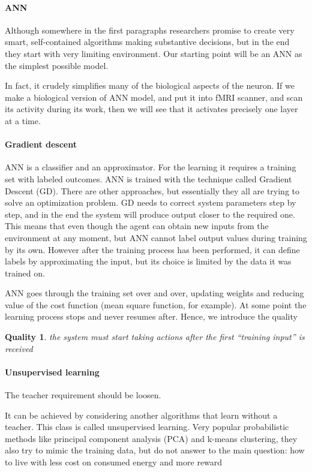 \documentclass[draft]{article}
\newtheorem{Qual}{Quality}
\begin{document}
\paragraph{ANN}
Although somewhere in the first paragraphs researchers promise to create very smart, self-contained algorithms making substantive decisions, but in the end they start with very limiting environment. Our starting point will be an ANN as the simplest possible model.

In fact, it crudely simplifies many of the biological aspects of the neuron. If we make a biological version of ANN model, and put it into fMRI scanner, and scan its activity during its work, then we will see that it activates precisely one layer at a time.

\paragraph{Gradient descent}
ANN is a classifier and an approximator. 
For the learning it requires a training set with labeled outcomes. 
ANN is trained with the technique called Gradient Descent (GD). There are other approaches, but essentially they all are trying to solve an optimization problem.
GD needs to correct system parameters step by step, and in the end the system will produce output closer to the required one.
This means that even though the agent can obtain new inputs from the environment at any moment, but ANN cannot label output values during training by its own. However after the training process has been performed, it can define labels by approximating the input, but its choice is limited by the data it was trained on.

ANN goes through the training set over and over, updating weights and reducing value of the cost function (mean square function, for example). At some point the learning process stops and never resumes after. Hence, we introduce the quality 

\begin{Qual}\label{q1}
the system must start taking actions after the first “training input” is received
\end{Qual}

\paragraph{Unsupervised learning}
The teacher requirement should be loosen. 

It can be achieved by considering another algorithms that learn without a teacher. This class is called unsupervised learning. Very popular probabilistic methods like principal component analysis (PCA) and k-means clustering, they also try to mimic the training data, but do not answer to the main question: how to live with less cost on consumed energy and more reward
\end{document}
